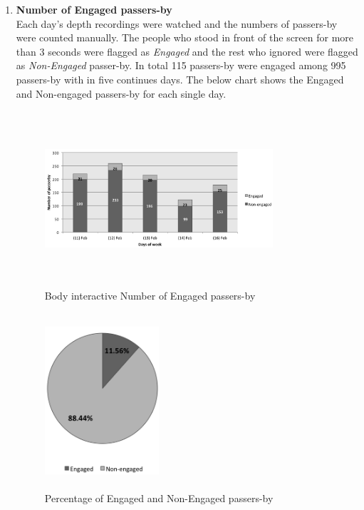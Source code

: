 \begin{enumerate}
\item \textbf{Number of Engaged passers-by} \\
Each day’s depth recordings were watched and the numbers of passers-by were counted manually. The people who stood in front of the screen for more than 3 seconds were flagged as \emph{Engaged} and the rest who ignored were flagged as \emph{Non-Engaged} passer-by. In total 115 passers-by were engaged among 995 passers-by with in five continues days. The below chart shows the Engaged and Non-engaged passers-by for each single day.

\begin{figure}[H]
    \centering
    \includegraphics[width=0.8\textwidth,height=6.5cm]{Figures/8/body_inter_findings/body_inter_engage_day}
    \caption{Body interactive Number of Engaged passers-by}%
    \label{fig:bodyengagedandengagedby}%
\end{figure}


\begin{figure}[H]
    \centering
    \includegraphics[width=0.4\textwidth,height=6.5cm]{Figures/8/body_inter_findings/body_eng_percentage}
    \caption{Percentage of Engaged and Non-Engaged passers-by}%
    \label{fig:bodyengagedpasserbypercentage}%
\end{figure}


\end{enumerate}

